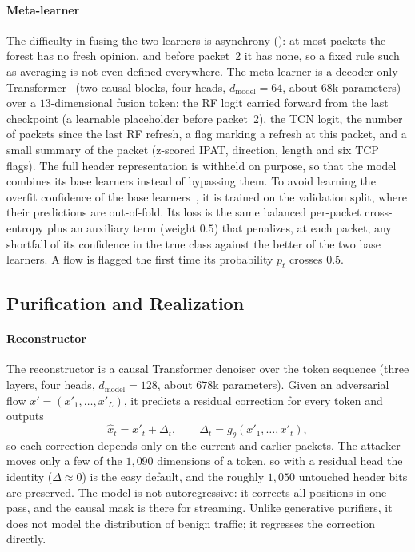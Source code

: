 \documentclass[acmtog,nonacm,pbalance]{acmart}
\begin{document}
\paragraph{Meta-learner} The difficulty in fusing the two learners is
asynchrony (): at most packets the forest has no fresh
opinion, and before packet~2 it has none, so a fixed rule such as averaging is
not even defined everywhere.
The meta-learner is a decoder-only Transformer~\cite{vaswani2017attention} (two
causal blocks, four heads, $d_{\text{model}}=64$, about $68$k parameters) over a
$13$-dimensional fusion token: the RF logit carried forward from the last
checkpoint (a learnable placeholder before packet~2), the TCN logit, the number
of packets since the last RF refresh, a flag marking a refresh at this packet,
and a small summary of the packet (z-scored IPAT, direction, length and six TCP
flags). The full header representation is withheld on purpose, so that the
model combines its base learners instead of bypassing them. To avoid learning
the overfit confidence of the base learners~\cite{wolpert1992stacked}, it is
trained on the validation split, where their predictions are out-of-fold. Its
loss is the same balanced per-packet cross-entropy plus an auxiliary term
(weight $0.5$) that penalizes, at each packet, any shortfall of its confidence
in the true class against the better of the two base learners. A flow is
flagged the first time its probability $p_t$ crosses $0.5$.

\subsection{Purification and Realization}\label{sec:purifier}

\paragraph{Reconstructor} The reconstructor is a causal Transformer denoiser
over the token sequence (three layers, four heads, $d_{\text{model}}=128$,
about $678$k parameters). Given an adversarial flow $x' = (x'_1,\dots,x'_L)$, it
predicts a residual correction for every token and outputs
\begin{equation}
  \hat{x}_t = x'_t + \Delta_t, \qquad \Delta_t = g_\theta(x'_1,\dots,x'_t),
  \label{eq:residual}
\end{equation}
so each correction depends only on the current and earlier packets. The attacker
moves only a few of the $1{,}090$ dimensions of a token, so with a residual
head the identity ($\Delta \approx 0$) is the easy default, and the roughly
$1{,}050$ untouched header bits are preserved. The model is not autoregressive:
it corrects all positions in one pass, and the causal mask is there for
streaming. Unlike generative purifiers, it does not model the distribution of
benign traffic; it regresses the correction directly.
\end{document}
